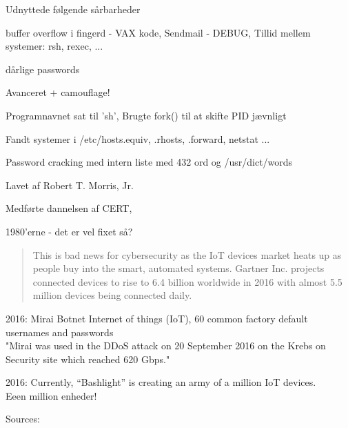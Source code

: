 \documentclass[20pt,landscape,a4paper,footrule]{foils}
\begin{document}
\begin{list1}
\item Udnyttede følgende sårbarheder
\begin{list2}
\item buffer overflow i fingerd - VAX kode, Sendmail - DEBUG, Tillid mellem systemer: rsh, rexec, ...
\item dårlige passwords
\end{list2}
\item Avanceret + camouflage!
\begin{list2}
\item Programnavnet sat til 'sh', Brugte fork() til at skifte PID jævnligt
\item Fandt systemer i /etc/hosts.equiv, .rhosts, .forward, netstat ...
\item Password cracking med intern liste med 432 ord og /usr/dict/words
\end{list2}
\item Lavet af Robert T. Morris, Jr.
\item Medførte dannelsen af CERT, 
\end{list1}

\centerline{1980'erne - det er vel fixet så?}



\begin{quote}
  This is bad news for cybersecurity as the IoT devices market heats up as people buy into the smart, automated systems. Gartner Inc. projects connected devices to rise to 6.4 billion worldwide in 2016 with almost 5.5 million devices being connected daily.
\end{quote}

\begin{list1}
\item 2016: Mirai Botnet Internet of things (IoT), 60 common factory default usernames and passwords\\
"Mirai was used in the DDoS attack on 20 September 2016 on the Krebs on Security site which reached 620 Gbps."

\item 2016: Currently, “Bashlight” is creating an army of a million IoT devices.\\
Eeen million enheder!

\end{list1}

Sources: \\
{\footnotesize{}}
\end{document}
